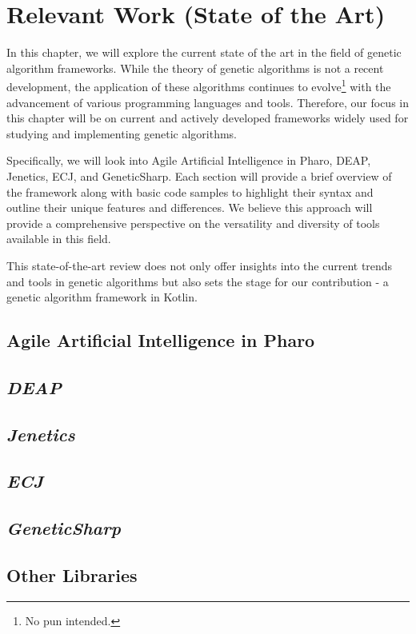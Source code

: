 \chapter{Relevant Work (State of the Art)}
\label{chap:sota}

  In this chapter, we will explore the current state of the art in the field of
  genetic algorithm frameworks.
  While the theory of genetic algorithms is not a recent development, the
  application of these algorithms continues to evolve\footnote{No pun intended.}
  with the advancement of various programming languages and tools.
  Therefore, our focus in this chapter will be on current and actively developed
  frameworks widely used for studying and implementing genetic algorithms.

  Specifically, we will look into Agile Artificial Intelligence in Pharo, DEAP,
  Jenetics, ECJ, and GeneticSharp.
  Each section will provide a brief overview of the framework along with basic
  code samples to highlight their syntax and outline their unique features and
  differences.
  We believe this approach will provide a comprehensive perspective on the
  versatility and diversity of tools available in this field.

  This state-of-the-art review does not only offer insights into the current
  trends and tools in genetic algorithms but also sets the stage for our
  contribution - a genetic algorithm framework in Kotlin.

  \section{Agile Artificial Intelligence in Pharo}
  \label{sec:sota:pharo}
    \Blindtext
  \section{\textit{DEAP}}
  \label{sec:sota:deap}
    \Blindtext
  \section{\textit{Jenetics}}
  \label{sec:sota:jenetics}
    \Blindtext
  \section{\textit{ECJ}}
  \label{sec:sota:ecj}
    \Blindtext
  \section{\textit{GeneticSharp}}
  \label{sec:sota:geneticsharp}
    \Blindtext
  \section{Other Libraries}
  \label{sec:sota:other}
    \Blindtext
